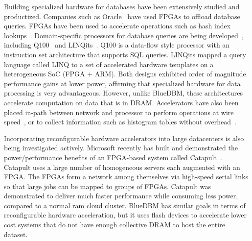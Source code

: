 Building specialized hardware for databases have been extensively studied and
productized. Companies such as Oracle~\cite{exadata} 
have used FPGAs to offload database queries.
FPGAs have been used to accelerate operations such as hash index
lookups~\cite{walkers}. Domain-specific processors for database queries are
being developed~\cite{databasefpga, hybridsql}, including Q100~\cite{q100} and LINQits~\cite{linqits}.
Q100 is a data-flow style processor with an instruction set architecture that
supports SQL queries. LINQits mapped a query language called LINQ to a set of
accelerated hardware templates on a heterogeneous SoC (FPGA + ARM). Both designs
exhibited order of magnitude performance gains at lower power, affirming that
specialized hardware for data processing is very advantageous.
However, unlike BlueDBM, these architectures accelerate computation on data that is in DRAM.
Accelerators have also been placed in-path between network and processor to perform operations
at wire speed~\cite{fpgastreamquery}, or to collect information such as
histogram tables without overhead~\cite{histogramssideeffect}.




Incorporating reconfigurable hardware accelerators into large datacenters is also being investigated actively. Microsoft recently has built and
demonstrated the power/performance benefits of an FPGA-based system called
Catapult~\cite{msr_catapult}.  Catapult uses a large number of homogeneous
servers each augmented with an FPGA.  The FPGAs form a network among themselves
via high-speed serial links so that large jobs can be mapped to groups of FPGAs.
Catapult was demonstrated to deliver much faster performance while consuming
less power, compared to a normal ram cloud cluster. BlueDBM has similar
goals in terms of reconfigurable hardware acceleration, but it uses flash
devices to accelerate lower cost systems that do not have enough collective DRAM
to host the entire dataset.

